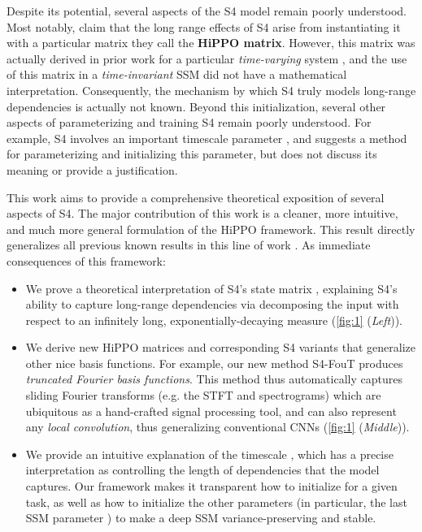 \documentclass{article}
\begin{document}
Despite its potential, several aspects of the S4 model remain poorly understood.
Most notably, \citet{gu2022efficiently} claim that the long range effects of S4 arise from instantiating it with a particular matrix they call the \textbf{HiPPO matrix}.
However, this matrix was actually derived in prior work for a particular \emph{time-varying} system \citep{gu2020hippo},
and the use of this matrix in a \emph{time-invariant} SSM did not have a mathematical interpretation.
Consequently, the mechanism by which S4 truly models long-range dependencies is actually not known.
Beyond this initialization, several other aspects of parameterizing and training S4 remain poorly understood.
For example, S4 involves an important timescale parameter ,
and suggests a method for parameterizing and initializing this parameter, but does not discuss its meaning or provide a justification.




This work aims to provide a comprehensive theoretical exposition of several aspects of S4.
The major contribution of this work is a cleaner, more intuitive, and much more general formulation of the HiPPO framework. This result directly generalizes all previous known results in this line of work \citep{voelker2019legendre,gu2020hippo,gu2021lssl,gu2022efficiently}.
As immediate consequences of this framework:
\begin{itemize}[leftmargin=*,itemsep=0pt]
  \item We prove a theoretical interpretation of S4's state matrix , explaining S4's ability to capture long-range dependencies via decomposing the input with respect to an infinitely long, exponentially-decaying measure (\cref{fig:1} (\emph{Left})).

  \item We derive new HiPPO matrices and corresponding S4 variants that generalize other nice basis functions.
    For example, our new method S4-FouT produces \emph{truncated Fourier basis functions}. This method thus automatically
    captures sliding Fourier transforms (e.g. the STFT and spectrograms) which are ubiquitous as a hand-crafted signal processing tool,
    and can also represent any \emph{local convolution}, thus generalizing conventional CNNs (\cref{fig:1} (\emph{Middle})).

  \item We provide an intuitive explanation of the timescale , which has a precise interpretation as controlling the length of dependencies that the model captures. Our framework makes it transparent how to initialize  for a given task, as well as how to initialize the other parameters (in particular, the last SSM parameter ) to make a deep SSM variance-preserving and stable.
\end{itemize}
\end{document}
